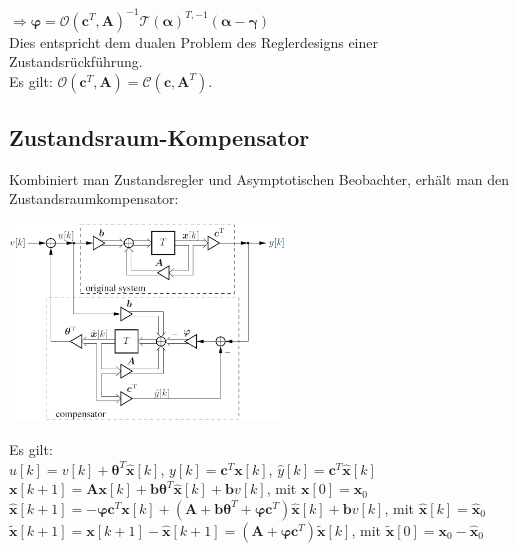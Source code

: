 \documentclass[a4paper,landscape,6pt]{article}
\newcommand{\ma}[1]{\ensuremath{\boldsymbol {#1}}}								%
\renewcommand{\vec}[1]{\ensuremath{\boldsymbol {#1}}}							%
\begin{document}
\begin{multicols}{3}
$\Rightarrow \boxed{\vec \varphi  = \ma{\mathcal{O}}(\vec c^T, \ma A)^{-1}\ma{\mathcal{T}}(\vec \alpha)^{T,-1} (\vec \alpha - \vec \gamma) }$\\

Dies entspricht dem dualen Problem des Reglerdesigns einer Zustandsrückführung.\\
Es gilt: $\ma{\mathcal{O}}(\vec c^T, \ma A) = \ma{\mathcal{C}}(\vec c, \ma A^T)$.
\subsection*{Zustandsraum-Kompensator}
Kombiniert man Zustandsregler und Asymptotischen Beobachter, erhält man den Zustandsraumkompensator:
\begin{minipage}[t]{0.5\textwidth}
	\includegraphics[width=0.55\textwidth]{images_ssp/compensator}\\
\end{minipage}
Es gilt:\\
$u[k] = v[k] + \vec \theta ^T \hat{\vec{x}}[k]$, $y[k] = \vec c^T \vec x[k]$, $\hat{y}[k] = \vec c^T \hat{\vec{x}}[k]$\\

$\vec x[k+1] = \ma A \vec x[k] + \vec b \vec \theta^T \hat{\vec{x}}[k] + \vec b v[k]$, mit $\vec x[0] = \vec x_0$\\

$\hat{\vec{x}}[k+1] = -\vec\varphi \vec c^T\vec x[k] + (\ma A + \vec b \vec \theta^T + \vec\varphi \vec c^T) \hat{\vec{x}}[k] + \vec b v[k]$, mit $\hat{\vec{x}}[k] = \hat{\vec{x}}_0$\\

$\tilde{\vec{x}}[k+1] = \vec x[k+1] - \hat{\vec{x}}[k+1] = (\ma A + \vec\varphi \vec c^T)\tilde{\vec{x}}[k]$, mit $\tilde{\vec{x}}[0] = \vec x_0 - \hat{\vec{x}}_0$\\


\end{multicols}
\end{document}

